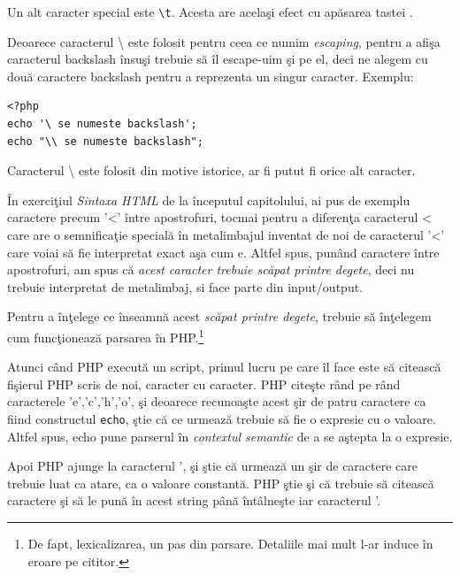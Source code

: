 Un alt caracter special este \texttt{{\textbackslash}t}.
Acesta are acelaşi efect cu apăsarea tastei .

Deoarece caracterul {\textbackslash} este folosit pentru ceea
ce numim \textsl{escaping}, pentru a afişa caracterul backslash
însuşi trebuie să îl escape-uim şi pe el, deci ne alegem cu
două caractere backslash pentru a reprezenta un singur caracter.
Exemplu:
\begin{lstlisting}
<?php
echo '\ se numeste backslash';
echo "\\ se numeste backslash";
\end{lstlisting}

Caracterul {\textbackslash} este folosit din motive istorice,
ar fi putut fi orice alt caracter.

În exerciţiul \textit{Sintaxa HTML} de la începutul
capitolului, ai pus de exemplu caractere precum '<' între
apostrofuri, tocmai pentru a diferenţa caracterul < care are
o semnificaţie specială în metalimbajul inventat de noi de
caracterul '<' care voiai să fie interpretat exact aşa cum e.
Altfel spus, punând caractere între apostrofuri, am spus
că \textit{acest caracter trebuie {\glqq}scăpat printre degete{\grqq}}, deci
nu trebuie interpretat de metalimbaj, si face parte din input/output.

Pentru a înţelege ce înseamnă acest \textit{scăpat printre degete},
trebuie să înţelegem cum funcţionează parsarea în PHP.\footnote{De fapt,
lexicalizarea, un pas din {\glqq}parsare{\grqq}. Detaliile mai mult l-ar
induce în eroare pe cititor.}

Atunci când PHP {\glqq}execută{\grqq} un script, primul lucru pe care îl
face este să citească fişierul PHP scris de noi, caracter
cu caracter. PHP citeşte rând pe rând caracterele 'e','c','h','o',
şi deoarece recunoaşte acest şir de patru caractere ca fiind
constructul \texttt{echo}, ştie că ce urmează trebuie să
fie o expresie cu o valoare. Altfel spus, {\glqq}echo{\grqq} pune
parserul în \textsl{contextul semantic} de a se aştepta la o
expresie.

Apoi PHP ajunge la caracterul ', şi ştie că urmează
un şir de caractere care trebuie luat ca atare, ca o valoare
constantă. PHP ştie şi că trebuie să citească caractere şi
să le pună în acest string până întâlneşte iar caracterul '.

